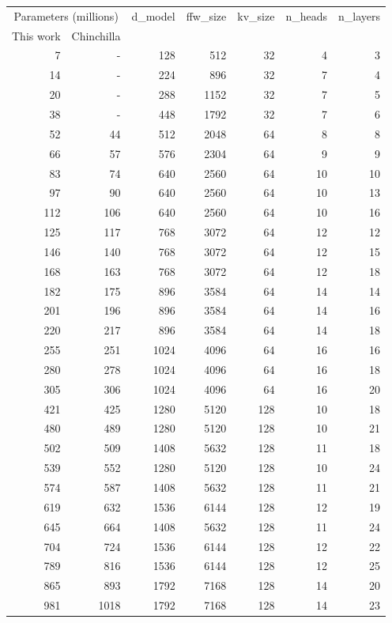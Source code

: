 \documentclass{article}
\begin{document}
\clearpage
\footnotesize
\begin{longtable}[h!]
{rr | rrrrr }
\toprule
\multicolumn{2}{c|}{Parameters (millions)} & d\_model & ffw\_size & kv\_size & n\_heads &  n\_layers \\
This work & Chinchilla & & &  &  & \\
\midrule
7 & - & 128 & 512 & 32 & 4 & 3 \\
14 & - & 224 & 896 & 32 & 7 & 4 \\
20 & - & 288 & 1152 & 32 & 7 & 5 \\
38 & - & 448 & 1792 & 32 & 7 & 6 \\
52 & 44 & 512 & 2048 & 64 & 8 & 8 \\
66 & 57 & 576 & 2304 & 64 & 9 & 9 \\
83 & 74 & 640 & 2560 & 64 & 10 & 10 \\
97 & 90 & 640 & 2560 & 64 & 10 & 13 \\
112 & 106 & 640 & 2560 & 64 & 10 & 16 \\
125 & 117 & 768 & 3072 & 64 & 12 & 12 \\
146 & 140 & 768 & 3072 & 64 & 12 & 15 \\
168 & 163 & 768 & 3072 & 64 & 12 & 18 \\
182 & 175 & 896 & 3584 & 64 & 14 & 14 \\
201 & 196 & 896 & 3584 & 64 & 14 & 16 \\
220 & 217 & 896 & 3584 & 64 & 14 & 18 \\
255 & 251 & 1024 & 4096 & 64 & 16 & 16 \\
280 & 278 & 1024 & 4096 & 64 & 16 & 18 \\
305 & 306 & 1024 & 4096 & 64 & 16 & 20 \\
421 & 425 & 1280 & 5120 & 128 & 10 & 18 \\
480 & 489 & 1280 & 5120 & 128 & 10 & 21 \\
502 & 509 & 1408 & 5632 & 128 & 11 & 18 \\
539 & 552 & 1280 & 5120 & 128 & 10 & 24 \\
574 & 587 & 1408 & 5632 & 128 & 11 & 21 \\
619 & 632 & 1536 & 6144 & 128 & 12 & 19 \\
645 & 664 & 1408 & 5632 & 128 & 11 & 24 \\
704 & 724 & 1536 & 6144 & 128 & 12 & 22 \\
789 & 816 & 1536 & 6144 & 128 & 12 & 25 \\
865 & 893 & 1792 & 7168 & 128 & 14 & 20 \\
981 & 1018 & 1792 & 7168 & 128 & 14 & 23 \\

\end{longtable}
\end{document}

